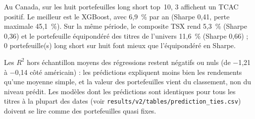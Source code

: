 Au Canada, sur les huit portefeuilles long short top~10, 3 affichent un TCAC positif. Le meilleur est le XGBoost, avec 6,9~\% par an (Sharpe 0,41, perte maximale 45,1~\%). Sur la même période, le composite TSX rend 5,3~\% (Sharpe 0,36) et le portefeuille équipondéré des titres de l'univers 11,6~\% (Sharpe 0,66) ; 0 portefeuille(s) long short sur huit font mieux que l'équipondéré en Sharpe.

Les $R^2$ hors échantillon moyens des régressions restent négatifs ou nuls (de $-$1,21 à $-$0,14 côté américain) : les prédictions expliquent moins bien les rendements qu'une moyenne simple, et la valeur des portefeuilles vient du classement, non du niveau prédit. Les modèles dont les prédictions sont identiques pour tous les titres à la plupart des dates (voir \texttt{results/v2/tables/prediction\_ties.csv}) doivent se lire comme des portefeuilles quasi fixes.
